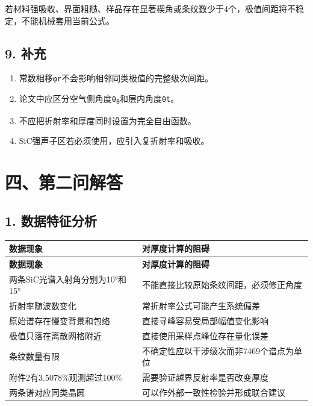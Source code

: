 \documentclass[11pt,a4paper]{ctexart}
\begin{document}
若材料强吸收、界面粗糙、样品存在显著楔角或条纹数少于4个，极值间距将不稳定，不能机械套用当前公式。


\subsection*{9. 补充}
\begin{enumerate}
\item 常数相移\texttt{φr}不会影响相邻同类极值的完整级次间距。
\item 论文中应区分空气侧角度\texttt{θ\textsubscript{0}}和层内角度\texttt{θt}。
\item 不应把折射率和厚度同时设置为完全自由函数。
\item SiC强声子区若必须使用，应引入复折射率和吸收。
\end{enumerate}
\section*{四、第二问解答}
\subsection*{1. 数据特征分析}
\begin{center}
\scriptsize
\begin{longtable}{|>{\raggedright\arraybackslash}p{}|>{\raggedright\arraybackslash}p{}|}
\hline
\textbf{数据现象} & \textbf{对厚度计算的阻碍} \\ \hline
\endfirsthead
\hline \textbf{数据现象} & \textbf{对厚度计算的阻碍} \\ \hline
\endhead
两条SiC光谱入射角分别为10°和15° & 不能直接比较原始条纹间距，必须修正角度 \\ \hline
折射率随波数变化 & 常折射率公式可能产生系统偏差 \\ \hline
原始谱存在慢变背景和包络 & 直接寻峰容易受局部幅值变化影响 \\ \hline
极值只落在离散网格附近 & 直接使用采样点峰位存在量化误差 \\ \hline
条纹数量有限 & 不确定性应以干涉级次而非7469个谱点为单位 \\ \hline
附件2有3.5078\%观测超过100\% & 需要验证越界反射率是否改变厚度 \\ \hline
两条谱对应同类晶圆 & 可以作外部一致性检验并形成联合建议 \\ \hline
\end{longtable}
\normalsize
\end{center}
\end{document}
